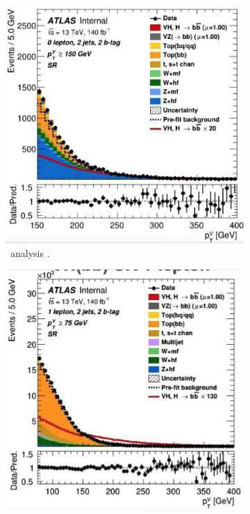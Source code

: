 \begin{figure}[h!]
    \centering
    \begin{subfigure}[b]{0.32\textwidth}
        \centering
        \includegraphics[width=\textwidth]{Images/VH/Fit/fromSlides/Postfit/0L_bb_2j.png}
        \caption{\vhc\ analysis \cite{Collaboration:2721696}.}
        \label{fig:fit_old_vhcclimit}
    \end{subfigure}
    \begin{subfigure}[b]{0.32\textwidth}
        \centering
        \includegraphics[width=\textwidth]{Images/VH/Fit/fromSlides/Postfit/1L_bb_2j.png}

\end{subfigure}
\end{figure}
